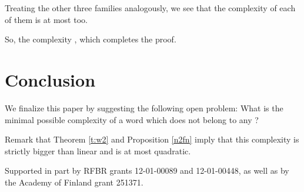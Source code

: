 \documentclass[runningheads,envcountsect,envcountsame]{llncs}
\begin{document}
Treating the other three families analogously, we see that the complexity of each of them is at most  too.
\iffalse
In the family 2, a word not belonging to family 1 contains factors  and . So, such a word is uniquely determined by ,  and the position of the first occurrence of , which takes values from 0 to . So, the number of such words is also .

An analogous counting works for the family 3: the new words
appearing there are determined by  and the first position of
, so, their number is .

At last, for the family 4, let us choose the first complete block  in a given word. Then this word is determined by ,  and the position of its beginning, so, the number of such words is again .
\fi
So, the complexity , which completes the proof. \hfill 


\section{Conclusion}

We finalize this paper by suggesting the following open problem: What is the minimal possible complexity of a word which does not
belong to any ?

Remark that Theorem \ref{t:w2} and Proposition \ref{n2fn} imply
that this complexity is strictly bigger than linear and is at most
quadratic.

\medskip
Supported in part by RFBR grants 12-01-00089 and  12-01-00448, as well as by the Academy of Finland grant 251371.
\end{document}

